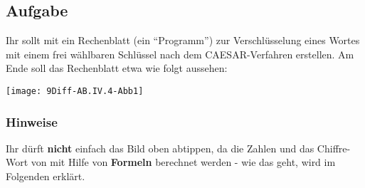 \documentclass[10pt, a4paper]{arbeitsblatt}
\begin{document}
\ReiheTitel

\subsection*{Aufgabe}
Ihr sollt mit  ein Rechenblatt (ein
\enquote{Programm}) zur Verschlüsselung eines Wortes mit einem frei
wählbaren Schlüssel nach dem CAESAR-Verfahren erstellen. Am Ende soll das
Rechenblatt etwa wie folgt aussehen:

\begin{center}
	\texttt{[image: 9Diff-AB.IV.4-Abb1]}
\end{center}

\subsubsection*{Hinweise}
Ihr dürft \textbf{nicht} einfach das Bild oben abtippen, da die Zahlen
und das Chiffre-Wort von  mit Hilfe von
\textbf{Formeln} berechnet werden - wie das geht, wird im Folgenden
erklärt.
\end{document}

